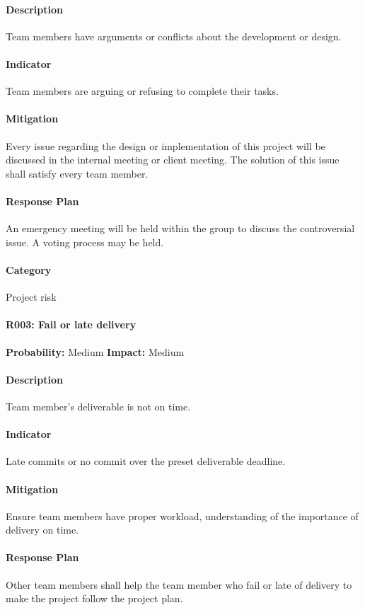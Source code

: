 \documentclass[11pt, a4paper]{report}
\begin{document}
	\paragraph{Description}Team members have arguments or conflicts about the development or design.
	\paragraph{Indicator}Team members are arguing or refusing to complete their tasks.
	\paragraph{Mitigation}Every issue regarding the design or implementation of this project will be discussed in the internal meeting or client meeting. The solution of this issue shall satisfy every team member.
	\paragraph{Response Plan}An emergency meeting will be held within the group to discuss the controversial issue. A voting process may be held.\\
	\paragraph{Category} Project risk
	
	\paragraph{R003: Fail or late delivery} \hspace{1cm} \textbf{Probability: }Medium\hspace{1cm}   \textbf{Impact: }Medium
	\paragraph{Description}Team member's deliverable is not on time.
	\paragraph{Indicator}Late commits or no commit over the preset deliverable deadline.
	\paragraph{Mitigation}Ensure team members have proper workload, understanding of the importance of delivery on time. 
	\paragraph{Response Plan}Other team members shall help the team member who fail or late of delivery to make the project follow the project plan. \\
\end{document}
